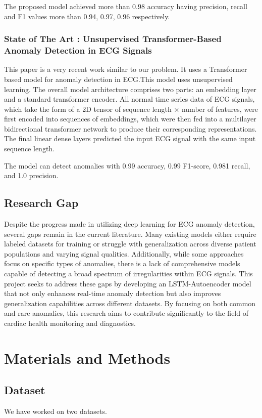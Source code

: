 \documentclass[nonacm,sigconf]{acmart}
\begin{document}
The proposed model achieved more than 0.98 accuracy having precision, recall and F1 values more than 0.94, 0.97, 0.96 respectively.

\subsubsection{\textbf{State of The Art : Unsupervised Transformer-Based Anomaly Detection in ECG Signals}}
This paper is a very recent work similar to our problem. It uses a Transformer based model for anomaly detection in ECG.This model uses unsupervised learning. The overall model architecture comprises two parts: an embedding layer and a standard transformer encoder. All normal time series data of ECG signals, which take the form of a 2D tensor of sequence length × number of features, were first encoded into sequences of embeddings, which were then fed into a multilayer bidirectional transformer network to produce their corresponding representations. The final linear dense layers predicted the input ECG signal with the same input sequence length.\cite{alamr2023unsupervised}

The model can detect anomalies with 0.99 accuracy, 0.99 F1-score, 0.981 recall, and 1.0 precision.

\subsection{Research Gap}
Despite the progress made in utilizing deep learning for ECG anomaly detection, several gaps remain in the current literature. Many existing models either require labeled datasets for training or struggle with generalization across diverse patient populations and varying signal qualities. Additionally, while some approaches focus on specific types of anomalies, there is a lack of comprehensive models capable of detecting a broad spectrum of irregularities within ECG signals. This project seeks to address these gaps by developing an LSTM-Autoencoder model that not only enhances real-time anomaly detection but also improves generalization capabilities across different datasets. By focusing on both common and rare anomalies, this research aims to contribute significantly to the field of cardiac health monitoring and diagnostics.

\section{Materials and Methods}
\subsection{Dataset}
We have worked on two datasets.
\end{document}
